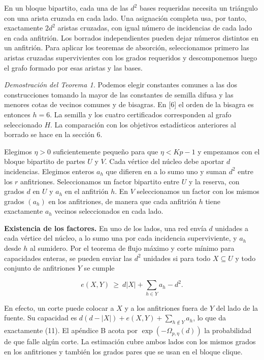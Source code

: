 \documentclass[spanish,11pt,a4paper]{article}
\begin{document}
En un bloque bipartito, cada una de las \(d^2\) bases requeridas necesita un triángulo con una arista cruzada en cada lado. Una asignación completa usa, por tanto, exactamente \(2d^2\) aristas cruzadas, con igual número de incidencias de cada lado en cada anfitrión. Los borrados independientes pueden dejar números distintos en un anfitrión. Para aplicar los teoremas de absorción, seleccionamos primero las aristas cruzadas supervivientes con los grados requeridos y descomponemos luego el grafo formado por esas aristas y las bases.

\emph{Demostración del Teorema 1.} Podemos elegir constantes comunes a las dos construcciones tomando la mayor de las constantes de semilla difusa y las menores cotas de vecinos comunes y de bisagras. En {[}6{]} el orden de la bisagra es entonces \(h=6\). La semilla y los cuatro certificados corresponden al grafo seleccionado \(H\). La comparación con los objetivos estadísticos anteriores al borrado se hace en la sección 6.

Elegimos \(\eta>0\) suficientemente pequeño para que \(\eta<Kp-1\) y empezamos con el bloque bipartito de partes \(U\) y \(V\). Cada vértice del núcleo debe aportar \(d\) incidencias. Elegimos enteros \(a_h\) que difieren en a lo sumo uno y suman \(d^2\) entre los \(r\) anfitriones. Seleccionamos un factor bipartito entre \(U\) y la reserva, con grados \(d\) en \(U\) y \(a_h\) en el anfitrión \(h\). En \(V\) seleccionamos un factor con los mismos grados \((a_h)\) en los anfitriones, de manera que cada anfitrión \(h\) tiene exactamente \(a_h\) vecinos seleccionados en cada lado.

\textbf{Existencia de los factores.} En uno de los lados, una red envía \(d\) unidades a cada vértice del núcleo, a lo sumo una por cada incidencia superviviente, y \(a_h\) desde \(h\) al sumidero. Por el teorema de flujo máximo y corte mínimo para capacidades enteras, se pueden enviar las \(d^2\) unidades si para todo \(X\subseteq U\) y todo conjunto de anfitriones \(Y\) se cumple

\[e(X,Y)\ \ge\ d|X|+\sum_{h\in Y}a_h-d^2.
\tag{11}\]

En efecto, un corte puede colocar a \(X\) y a los anfitriones fuera de \(Y\) del lado de la fuente. Su capacidad es \(d(d-|X|)+e(X,Y)+\sum_{h\notin Y}a_h\), lo que da exactamente (11). El apéndice B acota por \(\exp(-\Omega_{p,\eta}(d))\) la probabilidad de que falle algún corte. La estimación cubre ambos lados con los mismos grados en los anfitriones y también los grados pares que se usan en el bloque clique.
\end{document}
